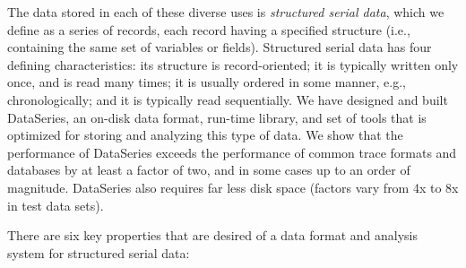 \documentclass{acm_proc_article-sp}
\begin{document}
The data stored in each of these diverse uses is {\it structured
serial data}, which we define as a series of records, each record
having a specified structure (i.e., containing the same set of
variables or fields). Structured serial data has four defining characteristics:
its structure is record-oriented; it is typically written only once,
and is read many times; it is usually ordered
in some manner, e.g., chronologically; and it is typically read
sequentially.  We have designed and built DataSeries, an on-disk 
data format, run-time library, and set of
tools that is optimized for storing and analyzing this type of data.
We show that the performance of DataSeries
exceeds the performance of common trace formats and databases by at
least a factor of two, and in some cases up to an order of
magnitude. DataSeries also requires far less disk space (factors vary
from 4x to 8x in test data sets).


There are six key properties that are desired of a data format
and analysis system for structured serial data:
\end{document}
